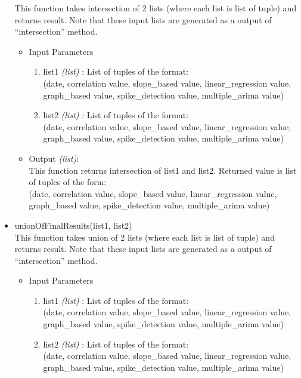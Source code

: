 \begin{itemize}
  This function takes intersection of 2 lists (where each list is list of 
tuple) and returns result. Note that these input lists are generated as a output 
of ``intersection'' method.
 \begin{itemize}
 \item Input Parameters
 
 \begin{enumerate}
  \item list1 \textit{(list)} : List of tuples of the format: \\
  (date, correlation value, slope\_based value, linear\_regression value, 
graph\_based value, spike\_detection value, multiple\_arima value)
  \item list2 \textit{(list)} :  List of tuples of the format:  \\
  (date, correlation value, slope\_based value, linear\_regression value, 
graph\_based value, spike\_detection value, multiple\_arima value)

 \end{enumerate}

 \item Output \textit{(list)}: \\
 This function returns intersection of list1 and list2. Returned value is list 
of tuples of the form: \\
 (date, correlation value, slope\_based value, linear\_regression value, 
graph\_based value, spike\_detection value, multiple\_arima value)

 \end{itemize}
 
 
 
 \item unionOfFinalResults(list1, list2) \\
 This function takes union of 2 lists (where each list is list of tuple) and 
returns result. Note that these input lists are generated as a output of 
``intersection'' method.
 \begin{itemize}
 \item Input Parameters
 
 \begin{enumerate}
  \item list1 \textit{(list)} : List of tuples of the format: \\
  (date, correlation value, slope\_based value, linear\_regression value, 
graph\_based value, spike\_detection value, multiple\_arima value)
  \item list2 \textit{(list)} :  List of tuples of the format:  \\
  (date, correlation value, slope\_based value, linear\_regression value, 
graph\_based value, spike\_detection value, multiple\_arima value)


\end{enumerate}
\end{itemize}
\end{itemize}
